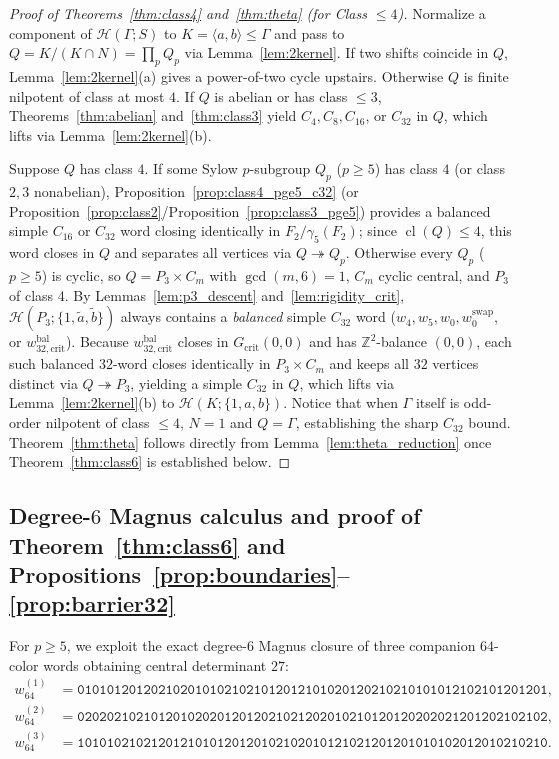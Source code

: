 \documentclass[11pt]{amsart}
\theoremstyle{definition}
\theoremstyle{remark}
\newcommand{\Z}{\mathbb{Z}}
\newcommand{\Haar}{\mathcal{H}}
\newcommand{\cl}{\operatorname{cl}}
\begin{document}
\begin{proof}[Proof of Theorems~\ref{thm:class4} and~\ref{thm:theta} (for Class $\le 4$)]
Normalize a component of $\Haar(\Gamma; S)$ to $K = \langle a, b \rangle \le \Gamma$ and pass to $Q = K/(K \cap N) = \prod_p Q_p$ via Lemma~\ref{lem:2kernel}. If two shifts coincide in $Q$, Lemma~\ref{lem:2kernel}(a) gives a power-of-two cycle upstairs. Otherwise $Q$ is finite nilpotent of class at most $4$. If $Q$ is abelian or has class $\le 3$, Theorems~\ref{thm:abelian} and~\ref{thm:class3} yield $C_4, C_8, C_{16}$, or $C_{32}$ in $Q$, which lifts via Lemma~\ref{lem:2kernel}(b).

Suppose $Q$ has class $4$. If some Sylow $p$-subgroup $Q_p$ ($p \ge 5$) has class $4$ (or class $2,3$ nonabelian), Proposition~\ref{prop:class4_pge5_c32} (or Proposition~\ref{prop:class2}/Proposition~\ref{prop:class3_pge5}) provides a balanced simple $C_{16}$ or $C_{32}$ word closing identically in $F_2/\gamma_5(F_2)$; since $\cl(Q) \le 4$, this word closes in $Q$ and separates all vertices via $Q \twoheadrightarrow Q_p$. Otherwise every $Q_p$ ($p \ge 5$) is cyclic, so $Q = P_3 \times C_m$ with $\gcd(m,6)=1$, $C_m$ cyclic central, and $P_3$ of class $4$. By Lemmas~\ref{lem:p3_descent} and~\ref{lem:rigidity_crit}, $\Haar(P_3; \{1,\tilde{a},\tilde{b}\})$ always contains a \emph{balanced} simple $C_{32}$ word ($w_4, w_5, w_0, w_0^{\mathrm{swap}}$, or $w_{32,\mathrm{crit}}^{\mathrm{bal}}$). Because $w_{32,\mathrm{crit}}^{\mathrm{bal}}$ closes in $G_{\mathrm{crit}}(0,0)$ and has $\Z^2$-balance $(0,0)$, each such balanced $32$-word closes identically in $P_3 \times C_m$ and keeps all $32$ vertices distinct via $Q \twoheadrightarrow P_3$, yielding a simple $C_{32}$ in $Q$, which lifts via Lemma~\ref{lem:2kernel}(b) to $\Haar(K; \{1,a,b\})$. Notice that when $\Gamma$ itself is odd-order nilpotent of class $\le 4$, $N = 1$ and $Q = \Gamma$, establishing the sharp $C_{32}$ bound. Theorem~\ref{thm:theta} follows directly from Lemma~\ref{lem:theta_reduction} once Theorem~\ref{thm:class6} is established below.
\end{proof}

\subsection{Degree-$6$ Magnus calculus and proof of Theorem~\ref{thm:class6} and Propositions~\ref{prop:boundaries}--\ref{prop:barrier32}}

For $p \ge 5$, we exploit the exact degree-$6$ Magnus closure of three companion $64$-color words obtaining central determinant $27$:
\begin{align*}
w_{64}^{(1)} &= \mathtt{0101012012021020101021021012012101020120210210101012102101201201}, \\
w_{64}^{(2)} &= \mathtt{0202021021012010202012012021021202010210120120202021201202102102}, \\
w_{64}^{(3)} &= \mathtt{1010102102120121010120120102102010121021201201010102012010210210}.
\end{align*}
\end{document}
